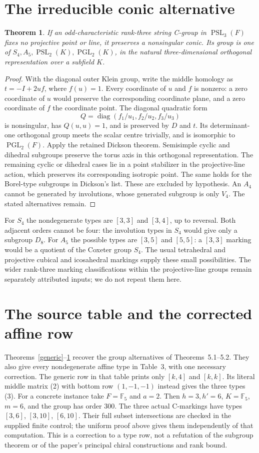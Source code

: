 \documentclass[11pt]{article}
\newtheorem{theorem}{Theorem}\newtheorem{lemma}[theorem]{Lemma}
\newcommand{\F}{\mathbb F}\newcommand{\gen}[1]{\langle#1\rangle}
\newcommand{\PSL}{\operatorname{PSL}}\newcommand{\PGL}{\operatorname{PGL}}
\begin{document}
\section*{The irreducible conic alternative}
\begin{theorem}\label{conic}
If an odd-characteristic rank-three string C-group in $\PSL_3(F)$
fixes no projective point or line, it preserves a nonsingular conic.
Its group is one of $S_4,A_5,\PSL_2(K),\PGL_2(K)$, in the natural
three-dimensional orthogonal representation over a subfield $K$.
\end{theorem}
\begin{proof}
With the diagonal outer Klein group, write the middle homology as
$t=-I+2uf$, where $f(u)=1$. Every coordinate of $u$ and $f$ is
nonzero: a zero coordinate of $u$ would preserve the corresponding
coordinate plane, and a zero coordinate of $f$ the coordinate point.
The diagonal quadratic form
\[
                         Q=\operatorname{diag}(f_1/u_1,f_2/u_2,f_3/u_3)
\]
is nonsingular, has $Q(u,u)=1$, and is preserved by $D$ and $t$.
Its determinant-one orthogonal group meets the scalar centre trivially,
and is isomorphic to $\PGL_2(F)$. Apply the retained Dickson theorem.
Semisimple cyclic and dihedral subgroups preserve the torus axis in
this orthogonal representation. The remaining cyclic or dihedral cases
lie in a point stabilizer in the projective-line action, which preserves
its corresponding isotropic point. The same holds for the Borel-type
subgroups in Dickson's list. These are excluded by
hypothesis. An $A_4$ cannot be generated by involutions, whose generated
subgroup is only $V_4$. The stated alternatives remain.
\end{proof}
For $S_4$ the nondegenerate types are $[3,3]$ and $[3,4]$, up to
reversal. Both adjacent orders cannot be four: the involution types in
$S_4$ would give only a subgroup $D_8$. For $A_5$ the possible types
are $[3,5]$ and $[5,5]$: a $[3,3]$ marking would be a quotient of
the Coxeter group $S_4$. The usual tetrahedral and projective cubical
and icosahedral markings supply these small possibilities. The wider
rank-three marking classifications within the projective-line groups
remain separately attributed inputs; we do not repeat them here.

\section*{The source table and the corrected affine row}
Theorems~\ref{generic}--\ref{conic} recover the group alternatives of
Theorems~5.1--5.2. They also give every nondegenerate affine type in
Table~3, with one necessary correction. The generic row in that table
prints only $[k,4]$ and $[k,k]$. Its literal middle matrix (2) with
bottom row $(1,-1,-1)$ instead gives the three types (3).
For a concrete instance take $F=\F_5$ and $a=2$. Then $h=3,h'=6$,
$K=\F_5$, $m=6$, and the group has order $300$. The three actual
C-markings have types $[3,6]$, $[3,10]$, $[6,10]$. Their full subset
intersections are checked in the supplied finite control; the uniform
proof above gives them independently of that computation. This is a
correction to a type row, not a refutation of the subgroup theorem or
of the paper's principal chiral constructions and rank bound.
\end{document}
